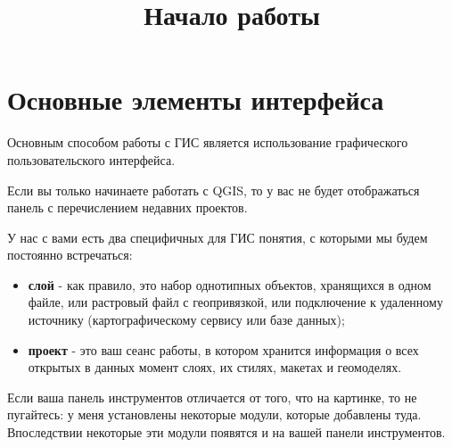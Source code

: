 \documentclass[
  russian,
]{article}
\title{Начало работы}
\author{}
\date{}
\begin{document}
\maketitle

\section{Основные элементы
интерфейса}\label{ux43eux441ux43dux43eux432ux43dux44bux435-ux44dux43bux435ux43cux435ux43dux442ux44b-ux438ux43dux442ux435ux440ux444ux435ux439ux441ux430}

Основным способом работы с ГИС является использование графического
пользовательского интерфейса.

Если вы только начинаете работать с QGIS, то у вас не будет отображаться
панель с перечислением недавних проектов.

\begin{tcolorbox}[enhanced jigsaw, arc=.35mm, bottomrule=.15mm, bottomtitle=1mm, breakable, colback=white, colbacktitle=quarto-callout-important-color!10!white, colframe=quarto-callout-important-color-frame, coltitle=black, left=2mm, leftrule=.75mm, opacityback=0, opacitybacktitle=0.6, rightrule=.15mm, title=\textcolor{quarto-callout-important-color}{\faExclamation}\hspace{0.5em}{Важно}, titlerule=0mm, toprule=.15mm, toptitle=1mm]

У нас с вами есть два специфичных для ГИС понятия, с которыми мы будем
постоянно встречаться:

\begin{itemize}
\item
  \textbf{слой} - как правило, это набор однотипных объектов, хранящихся
  в одном файле, или растровый файл с геопривязкой, или подключение к
  удаленному источнику (картографическому сервису или базе данных);
\item
  \textbf{проект} - это ваш сеанс работы, в котором хранится информация
  о всех открытых в данных момент слоях, их стилях, макетах и
  геомоделях.
\end{itemize}

\end{tcolorbox}

\begin{tcolorbox}[enhanced jigsaw, arc=.35mm, bottomrule=.15mm, bottomtitle=1mm, breakable, colback=white, colbacktitle=quarto-callout-tip-color!10!white, colframe=quarto-callout-tip-color-frame, coltitle=black, left=2mm, leftrule=.75mm, opacityback=0, opacitybacktitle=0.6, rightrule=.15mm, title=\textcolor{quarto-callout-tip-color}{\faLightbulb}\hspace{0.5em}{Дополнительно}, titlerule=0mm, toprule=.15mm, toptitle=1mm]

Если ваша панель инструментов отличается от того, что на картинке, то не
пугайтесь: у меня установлены некоторые модули, которые добавлены туда.
Впоследствии некоторые эти модули появятся и на вашей панели
инструментов.

\end{tcolorbox}
\end{document}
